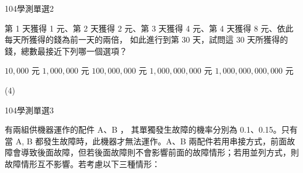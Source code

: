 \begin{QUESTIONS}
\begin{QUESTION}
\begin{QSOLLIST}
        \end{QSOLLIST}
        \begin{QEMPTYSPACE}
        \end{QEMPTYSPACE}
    \end{QUESTION}
    \begin{QUESTION}
        \begin{ExamInfo}{104}{學測}{單選}{2}
        \end{ExamInfo}
        \begin{ExamAnsRateInfo}{68}{88}{72}{44}
        \end{ExamAnsRateInfo}
        \begin{QBODY}
            第 1 天獲得 1 元、第 2 天獲得 2 元、第 3 天獲得 4 元、第 4 天獲得 8 元、依此每天所獲得的錢為前一天的兩倍， 如此進行到第 30 天，試問這 30 天所獲得的錢，總數最接近下列哪一個選項？
		\begin{QOPS}
			\QOP $10,000$ 元
			\QOP $1,000,000$ 元
			\QOP $100,000,000$ 元
			\QOP $1,000,000,000$ 元
			\QOP $1,000,000,000,000$ 元
		\end{QOPS}
        \end{QBODY}
        \begin{QFROMS}
        \end{QFROMS}
        \begin{QTAGS}\end{QTAGS}
        \begin{QANS}
            (4)
        \end{QANS}
        \begin{QSOLLIST}
        \end{QSOLLIST}
        \begin{QEMPTYSPACE}
        \end{QEMPTYSPACE}
    \end{QUESTION}
    \begin{QUESTION}
        \begin{ExamInfo}{104}{學測}{單選}{3}
        \end{ExamInfo}
        \begin{ExamAnsRateInfo}{57}{78}{60}{33}
        \end{ExamAnsRateInfo}
        \begin{QBODY}
            有兩組供機器運作的配件 A、B ， 其單獨發生故障的機率分別為 0.1、0.15。只有當 A, B 都發生故障時，此機器才無法運作。A、B 兩配件若用串接方式，前面故障會導致後面故障，但若後面故障則不會影響前面的故障情形；若用並列方式，則故障情形互不影響。若考慮以下三種情形：\\

\end{QBODY}
\end{QUESTION}
\end{QUESTIONS}
